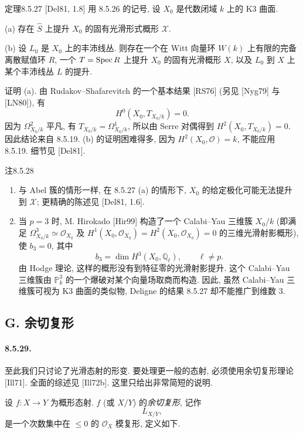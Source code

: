 \begin{origstatement}{定理}{8.5.27}\label{ch08:th8527}
[Del81, 1.8] 用 8.5.26 的记号, 设 $X_0$ 是代数闭域 $k$ 上的 K3 曲面.

(a) 存在 $\widehat S$ 上提升 $X_0$ 的固有光滑形式概形 $\mathcal X$.

(b) 设 $L_0$ 是 $X_0$ 上的丰沛线丛. 则存在一个在 Witt 向量环 $W(k)$ 上有限的完备离散赋值环 $R$, 一个 $T=\operatorname{Spec} R$ 上提升 $X_0$ 的固有光滑概形 $X$, 以及 $L_0$ 到 $X$ 上某个丰沛线丛 $L$ 的提升.
\end{origstatement}
证明 (a). 由 Rudakov--Shafarevitch 的一个基本结果 [RS76] (另见 [Nyg79] 与 [LN80]), 有
\[H^0(X_0,T_{X_0/k})=0.\]
因为 $\Omega^2_{X_0/k}$ 平凡, 有 $T_{X_0/k}=\Omega^1_{X_0/k}$, 所以由 Serre 对偶得到 $H^2(X_0,T_{X_0/k})=0$. 因此结论来自 8.5.19. (b) 的证明困难得多, 因为 $H^2(X_0,\mathcal O)=k$, 不能应用 8.5.19. 细节见 [Del81].

\begin{origstatement}{注}{8.5.28}\label{ch08:rem8528}
\begin{enumerate}
\item[(a)] 与 Abel 簇的情形一样, 在 8.5.27 (a) 的情形下, $X_0$ 的给定极化可能无法提升到 $\mathcal X$; 更精确的陈述见 [Del81, 1.6].
\item[(b)] 当 $p=3$ 时, M. Hirokado [Hir99] 构造了一个 Calabi--Yau 三维簇 $X_0/k$ (即满足 $\Omega^3_{X_0/k}\simeq\mathcal O_{X_0}$ 及 $H^1(X_0,\mathcal O_{X_0})=H^2(X_0,\mathcal O_{X_0})=0$ 的三维光滑射影概形), 使 $b_3=0$, 其中
\[b_3=\dim H^3(X_0,\mathbb Q_\ell),\qquad\ell\ne p.\]
由 Hodge 理论, 这样的概形没有到特征零的光滑射影提升. 这个 Calabi--Yau 三维簇由 $\mathbb P_k^3$ 的一个爆破对某个向量场取商而构造. 因此, 虽然 Calabi--Yau 三维簇可视为 K3 曲面的类似物, Deligne 的结果 8.5.27 却不能推广到维数 3.
\end{enumerate}
\end{origstatement}

\subsection*{G. 余切复形}
\paragraph{8.5.29.}
至此我们只讨论了光滑态射的形变. 要处理更一般的态射, 必须使用余切复形理论 [Ill71]. 全面的综述见 [Ill72b]. 这里只给出非常简短的说明.

设 $f:X\to Y$ 为概形态射. $f$ (或 $X/Y$) 的\emph{余切复形}, 记作
\[L_{X/Y},\]
是一个次数集中在 $\leq0$ 的 $\mathcal O_X$ 模复形, 定义如下.

